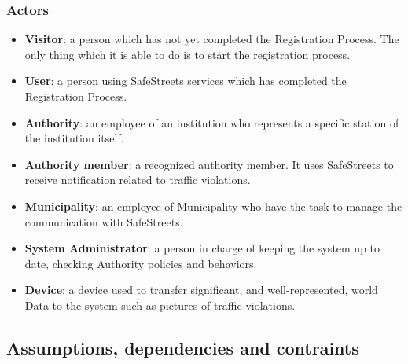 \documentclass[12pt]{article}
\begin{document}
\subsubsection{Actors}
\vspace{2mm}
\begin{itemize}
\item \textbf{Visitor}: a person which has not yet completed the Registration Process. The only thing which it is able to do is to start the registration process. 

\item \textbf{User}: a person using SafeStreets services which has completed the Registration Process. 

\item \textbf{Authority}: an employee of an institution who represents a specific station of the institution itself. 

\item \textbf{Authority member}: a recognized authority member. It uses SafeStreets to receive notification related to traffic violations.

\item \textbf{Municipality}: an employee of Municipality who have the task to manage the communication with SafeStreets.

\item \textbf{System Administrator}: a person in charge of keeping the system up to date, checking Authority policies and behaviors.

\item \textbf{Device}: a device used to transfer significant, and well-represented, world Data to the system such as pictures of traffic violations.
\end{itemize}


\subsection{Assumptions, dependencies and contraints}
\vspace{3mm}
\end{document}
